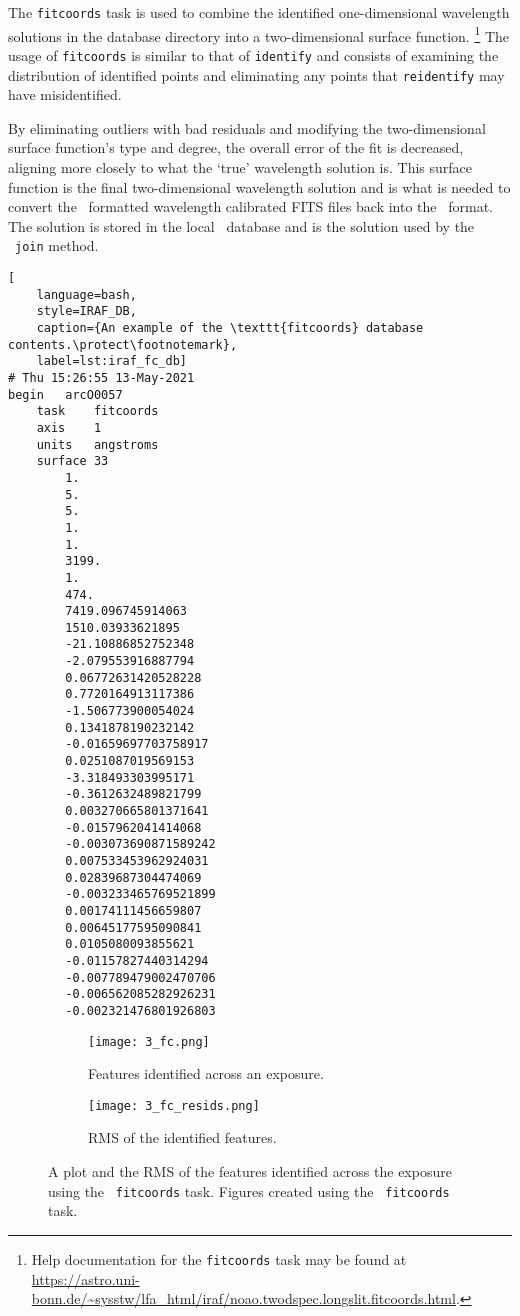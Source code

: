 The \texttt{fitcoords} task is used to combine the identified one-dimensional wavelength solutions in the database directory into a two-dimensional surface function.%
\footnote{Help documentation for the \texttt{fitcoords} task may be found at \url{https://astro.uni-bonn.de/~sysstw/lfa_html/iraf/noao.twodspec.longslit.fitcoords.html}.}
The usage of \texttt{fitcoords} is similar to that of \texttt{identify} and consists of examining the distribution of identified points and eliminating any points that \texttt{reidentify} may have misidentified.

By eliminating outliers with bad residuals and modifying the two-dimensional surface function's type and degree, the overall error of the fit is decreased, aligning more closely to what the `true' wavelength solution is.
This surface function is the final two-dimensional wavelength solution and is what is needed to convert the \iraf\ formatted wavelength calibrated \gls{FITS} files back into the \polsalt\ format. The solution is stored in the local \iraf\ database and is the solution used by the \stops\ \texttt{join} method.

\begin{lstlisting}[
    language=bash,
    style=IRAF_DB,
    caption={An example of the \texttt{fitcoords} database contents.\protect\footnotemark},
    label=lst:iraf_fc_db]
# Thu 15:26:55 13-May-2021
begin	arcO0057
	task	fitcoords
	axis	1
	units	angstroms
	surface	33
		1.
		5.
		5.
		1.
		1.
		3199.
		1.
		474.
		7419.096745914063
		1510.03933621895
		-21.10886852752348
		-2.079553916887794
		0.06772631420528228
		0.7720164913117386
		-1.506773900054024
		0.1341878190232142
		-0.01659697703758917
		0.0251087019569153
		-3.318493303995171
		-0.3612632489821799
		0.003270665801371641
		-0.0157962041414068
		-0.003073690871589242
		0.007533453962924031
		0.02839687304474069
		-0.003233465769521899
		0.00174111456659807
		0.00645177595090841
		0.0105080093855621
		-0.01157827440314294
		-0.007789479002470706
		-0.006562085282926231
		-0.002321476801926803

\end{lstlisting}

\begin{figure}
    \centering
    \begin{subfigure}[b]{0.49\textwidth}
        \centering
        \texttt{[image: 3\_fc.png]}
        \caption{Features identified across an exposure.}
    \end{subfigure}
    \hfill
    \begin{subfigure}[b]{0.49\textwidth}
        \centering
        \texttt{[image: 3\_fc\_resids.png]}
        \caption{\gls{RMS} of the identified features.}
    \end{subfigure}
    \caption{A plot and the \gls{RMS} of the features identified across the exposure using the \iraf\ \texttt{fitcoords} task. Figures created using the \iraf\ \texttt{fitcoords} task.}
    \label{fig:iraf_fc_plot}
\end{figure}

